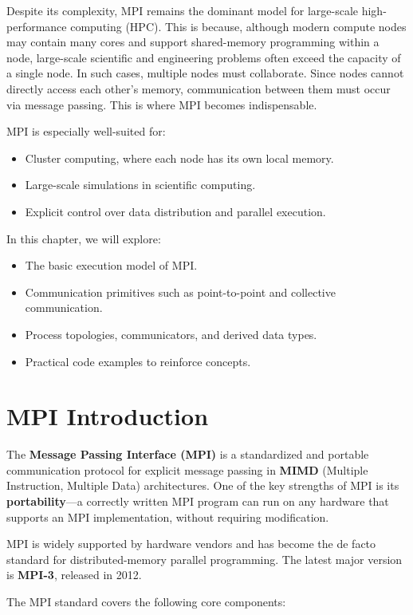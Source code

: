\documentclass[12pt]{book}
\begin{document}
Despite its complexity, MPI remains the dominant model for large-scale high-performance computing (HPC). This is because, although modern compute nodes may contain many cores and support shared-memory programming within a node, large-scale scientific and engineering problems often exceed the capacity of a single node. In such cases, multiple nodes must collaborate. Since nodes cannot directly access each other’s memory, communication between them must occur via message passing. This is where MPI becomes indispensable.

MPI is especially well-suited for:
\begin{itemize}
    \item Cluster computing, where each node has its own local memory.
    \item Large-scale simulations in scientific computing.
    \item Explicit control over data distribution and parallel execution.
\end{itemize}

In this chapter, we will explore:
\begin{itemize}
    \item The basic execution model of MPI.
    \item Communication primitives such as point-to-point and collective communication.
    \item Process topologies, communicators, and derived data types.
    \item Practical code examples to reinforce concepts.
\end{itemize}


\section{MPI Introduction}

The \textbf{Message Passing Interface (MPI)} is a standardized and portable communication protocol for explicit message passing in \textbf{MIMD} (Multiple Instruction, Multiple Data) architectures. One of the key strengths of MPI is its \textbf{portability}—a correctly written MPI program can run on any hardware that supports an MPI implementation, without requiring modification.

MPI is widely supported by hardware vendors and has become the de facto standard for distributed-memory parallel programming. The latest major version is \textbf{MPI-3}, released in 2012.

The MPI standard covers the following core components:
\end{document}
